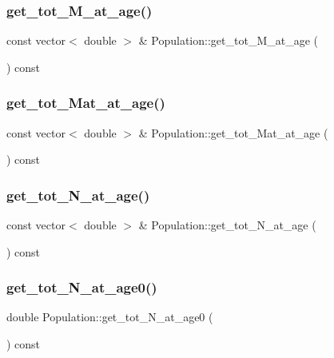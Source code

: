 \subsubsection{\texorpdfstring{get\_tot\_M\_at\_age()}{get\_tot\_M\_at\_age()}}
{\footnotesize\ttfamily const vector$<$ double $>$ \& Population\+::get\+\_\+tot\+\_\+\+M\+\_\+at\+\_\+age (\begin{DoxyParamCaption}{ }\end{DoxyParamCaption}) const}

\mbox{\label{class_population_a00ebf8857a53212013ca327623a7d729}} 
\subsubsection{\texorpdfstring{get\_tot\_Mat\_at\_age()}{get\_tot\_Mat\_at\_age()}}
{\footnotesize\ttfamily const vector$<$ double $>$ \& Population\+::get\+\_\+tot\+\_\+\+Mat\+\_\+at\+\_\+age (\begin{DoxyParamCaption}{ }\end{DoxyParamCaption}) const}

\mbox{\label{class_population_a513cd369ddc2d0f523b68cb9cee54a29}} 
\subsubsection{\texorpdfstring{get\_tot\_N\_at\_age()}{get\_tot\_N\_at\_age()}}
{\footnotesize\ttfamily const vector$<$ double $>$ \& Population\+::get\+\_\+tot\+\_\+\+N\+\_\+at\+\_\+age (\begin{DoxyParamCaption}{ }\end{DoxyParamCaption}) const}

\mbox{\label{class_population_a063d604c1f6a28fe3c4b12732f6f1fe8}} 
\subsubsection{\texorpdfstring{get\_tot\_N\_at\_age0()}{get\_tot\_N\_at\_age0()}}
{\footnotesize\ttfamily double Population\+::get\+\_\+tot\+\_\+\+N\+\_\+at\+\_\+age0 (\begin{DoxyParamCaption}{ }\end{DoxyParamCaption}) const}

